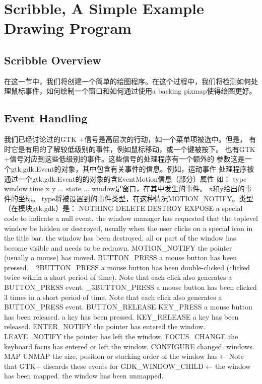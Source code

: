 \chapter{Scribble, A Simple Example Drawing Program}
\section{Scribble Overview}
在这一节中，我们将创建一个简单的绘图程序。在这个过程中，我们将检测如何处理鼠标事件，如何绘制一个窗口和如何通过使用a backing pixmap使得绘图更好。
\section{Event Handling}
我们已经讨论过的GTK +信号是高层次的行动，如一个菜单项被选中。但是，
有时它是有用的了解较低级别的事件，例如鼠标移动，或一个键被按下。
也有GTK +信号对应到这些低级别的事件。这些信号的处理程序有一个额外的
参数这是一个gtk.gdk.Event的对象，其中包含有关事件的信息。例如，运动事件
处理程序被通过一个gtk.gdk.Event的的对象的含EventMotion信息（部分）属性
如：
type
window
time
x
y
...
state
...
window是窗口，在其中发生的事件。
x和y给出的事件的坐标。
type将被设置到的事件类型，在这种情况MOTION_NOTIFY。类型（在模块gtk.gdk）是：
NOTHING
DELETE
DESTROY
EXPOSE
a special code to indicate a null event.
the window manager has requested that the toplevel window be
hidden or destroyed, usually when the user clicks on a special
icon in the title bar.
the window has been destroyed.
all or part of the window has become visible and needs to be
redrawn.
MOTION_NOTIFY the pointer (usually a mouse) has moved.
BUTTON_PRESS a mouse button has been pressed.
_2BUTTON_PRESS a mouse button has been double-clicked (clicked twice within
              a short period of time). Note that each click also generates a
	                   BUTTON_PRESS event.
			   _3BUTTON_PRESS a mouse button has been clicked 3 times in a short period of
			                 time. Note that each click also generates a BUTTON_PRESS event.
					 BUTTON_RELEASE
					 KEY_PRESS
					 a mouse button has been released.
					 a key has been pressed.
					 KEY_RELEASE a key has been released.
					 ENTER_NOTIFY the pointer has entered the window.
					 LEAVE_NOTIFY the pointer has left the window.
					 FOCUS_CHANGE the keyboard focus has entered or left the window.
					 CONFIGURE
					 changed.
					 windows.
					 MAP
					 UNMAP
					 the size, position or stacking order of the window has
					 ←
					 Note that GTK+ discards these events for GDK_WINDOW_CHILD
					 ←
					 the window has been mapped.
					 the window has been unmapped.
